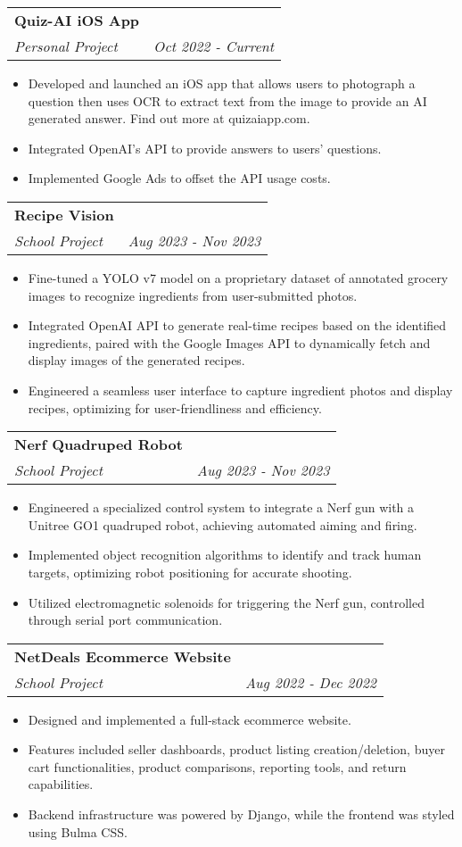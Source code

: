 \documentclass[letterpaper,11pt]{article}
\makeatletter
\newcommand{\resumeItem}[2]{
  \item\small{
    \textbf{#1}{#2 \vspace{-2pt}}
  }
}
\newcommand{\resumeSubheading}[4]{
  \vspace{-1pt}\item
    \begin{tabular*}{0.97\textwidth}[t]{l@{\extracolsep{\fill}}r}
      \textbf{#1} & #2 \\
      \textit{\small#3} & \textit{\small #4} \\
    \end{tabular*}\vspace{-5pt}
}
\newcommand{\resumeItemListStart}{\begin{itemize}}
\newcommand{\resumeItemListEnd}{\end{itemize}\vspace{-5pt}}
\makeatother
\begin{document}
    \resumeSubheading
      {Quiz-AI iOS App}{}
      {Personal Project}{Oct 2022 - Current}
      \resumeItemListStart
        \resumeItem{}
          {Developed and launched an iOS app that allows users to photograph a question then uses OCR to extract text from the image to provide an AI generated answer. Find out more at quizaiapp.com.}
        \resumeItem{}
          {Integrated OpenAI's API to provide answers to users' questions.}
        \resumeItem{}
          {Implemented Google Ads to offset the API usage costs.}
      \resumeItemListEnd

    \resumeSubheading
      {Recipe Vision}{}
      {School Project}{Aug 2023 - Nov 2023}
      \resumeItemListStart
        \resumeItem{}
          {Fine-tuned a YOLO v7 model on a proprietary dataset of annotated grocery images to recognize ingredients from user-submitted photos.}
        \resumeItem{}
          {Integrated OpenAI API to generate real-time recipes based on the identified ingredients, paired with the Google Images API to dynamically fetch and display images of the generated recipes.}
        \resumeItem{}
          {Engineered a seamless user interface to capture ingredient photos and display recipes, optimizing for user-friendliness and efficiency.}
        \resumeItemListEnd

    \resumeSubheading
      {Nerf Quadruped Robot}{}
      {School Project}{Aug 2023 - Nov 2023}
      \resumeItemListStart
        \resumeItem{}
          {Engineered a specialized control system to integrate a Nerf gun with a Unitree GO1 quadruped robot, achieving automated aiming and firing.}
        \resumeItem{}
          {Implemented object recognition algorithms to identify and track human targets, optimizing robot positioning for accurate shooting.}
        \resumeItem{}
          {Utilized electromagnetic solenoids for triggering the Nerf gun, controlled through serial port communication.}
        \resumeItemListEnd

    \resumeSubheading
    {NetDeals Ecommerce Website}{}
    {School Project}{Aug 2022 - Dec 2022}
    \resumeItemListStart
      \resumeItem{}
        {Designed and implemented a full-stack ecommerce website.}
      \resumeItem{}
        {Features included seller dashboards, product listing creation/deletion, buyer cart functionalities, product comparisons, reporting tools, and return capabilities.}
        \resumeItem{}
        {Backend infrastructure was powered by Django, while the frontend was styled using Bulma CSS.}
        \resumeItemListEnd
\end{document}
